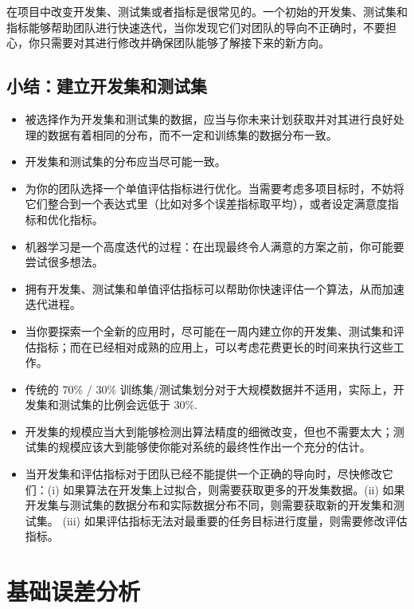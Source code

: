 在项目中改变开发集、测试集或者指标是很常见的。一个初始的开发集、测试集和指标能够帮助团队进行快速迭代，当你发现它们对团队的导向不正确时，不要担心，你只需要对其进行修改并确保团队能够了解接下来的新方向。

\hypertarget{ux5c0fux7ed3ux5efaux7acbux5f00ux53d1ux96c6ux548cux6d4bux8bd5ux96c6}{%
\chapter{小结：建立开发集和测试集}\label{ux5c0fux7ed3ux5efaux7acbux5f00ux53d1ux96c6ux548cux6d4bux8bd5ux96c6}}

\begin{itemize}
\tightlist
\item
  被选择作为开发集和测试集的数据，应当与你未来计划获取并对其进行良好处理的数据有着相同的分布，而不一定和训练集的数据分布一致。
\item
  开发集和测试集的分布应当尽可能一致。
\item
  为你的团队选择一个单值评估指标进行优化。当需要考虑多项目标时，不妨将它们整合到一个表达式里（比如对多个误差指标取平均），或者设定满意度指标和优化指标。
\item
  机器学习是一个高度迭代的过程：在出现最终令人满意的方案之前，你可能要尝试很多想法。
\item
  拥有开发集、测试集和单值评估指标可以帮助你快速评估一个算法，从而加速迭代进程。
\item
  当你要探索一个全新的应用时，尽可能在一周内建立你的开发集、测试集和评估指标；而在已经相对成熟的应用上，可以考虑花费更长的时间来执行这些工作。
\item
  传统的 70\% / 30\%
  训练集/测试集划分对于大规模数据并不适用，实际上，开发集和测试集的比例会远低于
  30\%.
\item
  开发集的规模应当大到能够检测出算法精度的细微改变，但也不需要太大；测试集的规模应该大到能够使你能对系统的最终性作出一个充分的估计。
\item
  当开发集和评估指标对于团队已经不能提供一个正确的导向时，尽快修改它们：(i)
  如果算法在开发集上过拟合，则需要获取更多的开发集数据。(ii)
  如果开发集与测试集的数据分布和实际数据分布不同，则需要获取新的开发集和测试集。
  (iii) 如果评估指标无法对最重要的任务目标进行度量，则需要修改评估指标。
\end{itemize}

\hypertarget{ux57faux7840ux8befux5deeux5206ux6790}{%
\part{基础误差分析}\label{ux57faux7840ux8befux5deeux5206ux6790}}

